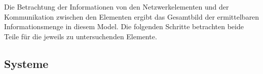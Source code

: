 Die Betrachtung der Informationen von den Netzwerkelementen und der Kommunikation zwischen den Elementen ergibt das Gesamtbild der ermittelbaren Informationsmenge in diesem Model. Die folgenden Schritte betrachten beide Teile für die jeweils zu untersuchenden Elemente.

\subsection{Systeme}




